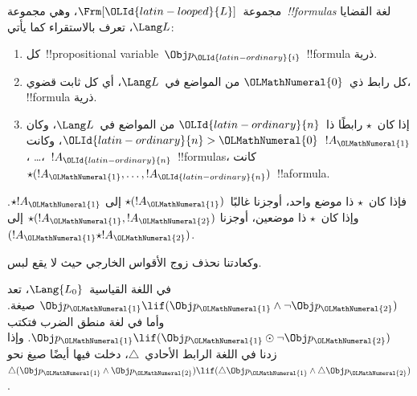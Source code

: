 \documentclass[../../../include/open-logic-section]{subfiles}
\begin{document}


\begin{defn}[الصيغة]
مجموعة~$\Frm[{\OLId{latin-looped}{L}}]$، وهي مجموعة~\emph{!!{formula}s} لغة القضايا
$\Lang L$، تعرف بالاستقراء كما يأتي:
\begin{enumerate}
\item كل~!!{propositional variable}~$\Obj p_{\OLId{latin-ordinary}{i}}$~!!{formula} ذرية.
\item كل رابط ذي~${\OLMathNumeral{0}}$ من المواضع في~$\Lang L$، أي كل ثابت قضوي،
!!{formula} ذرية.
\item إذا كان~$\star$ رابطًا ذا~${\OLId{latin-ordinary}{n}}$ من المواضع في~$\Lang L$، وكان
${\OLId{latin-ordinary}{n}}>{\OLMathNumeral{0}}$، وكانت~$!A_{\OLMathNumeral{1}}$، \dots،~$!A_{\OLId{latin-ordinary}{n}}$~!!{formula}s، كانت
$\star(!A_{\OLMathNumeral{1}}, \dots, !A_{\OLId{latin-ordinary}{n}})$~!!a{formula}.
\end{enumerate}
فإذا كان~$\star$ ذا موضع واحد، أوجزنا غالبًا~$\star(!A_{\OLMathNumeral{1}})$ إلى
$\star !A_{\OLMathNumeral{1}}$. وإذا كان~$\star$ ذا موضعين، أوجزنا
$\star(!A_{\OLMathNumeral{1}},!A_{\OLMathNumeral{2}})$ إلى~$(!A_{\OLMathNumeral{1}} \star !A_{\OLMathNumeral{2}})$.
\end{defn}

وكعادتنا نحذف زوج الأقواس الخارجي حيث لا يقع لبس.

\begin{ex}
  في اللغة القياسية~$\Lang{L_0}$، تعد
  $\Obj p_{\OLMathNumeral{1}} \lif (\Obj p_{\OLMathNumeral{1}} \land \lnot \Obj p_{\OLMathNumeral{2}})$ صيغة.
  وأما في لغة منطق الضرب فتكتب
  $\Obj p_{\OLMathNumeral{1}} \lif (\Obj p_{\OLMathNumeral{1}} \odot \lnot \Obj p_{\OLMathNumeral{2}})$.
  وإذا زدنا في اللغة الرابط الأحادي~$\triangle$، دخلت فيها أيضًا
  صيغ نحو~$\triangle (\Obj p_{\OLMathNumeral{1}} \land \Obj p_{\OLMathNumeral{2}}) \lif
  (\triangle \Obj p_{\OLMathNumeral{1}} \land \triangle \Obj p_{\OLMathNumeral{2}})$.
\end{ex}
\end{document}
